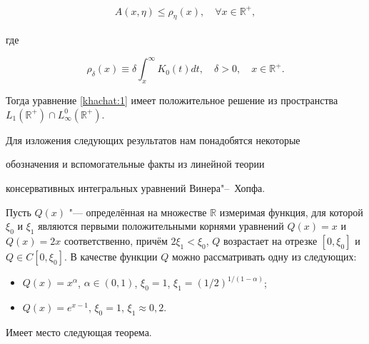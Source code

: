 \begin{theorem}[1]
\begin{itemize}
\begin{gather}
A(x,\eta)\leq\rho_{\eta}(x),\quad \forall x\in\mathbb{R}^+,

\label{khachat:7}

\end{gather}

где

\begin{equation}

\rho_{\delta}(x)\equiv\delta\int _{x}^{\infty}K_0(t)dt,\quad

\delta>0,\quad x\in\mathbb{R}^+.\label{khachat:8}

\end{equation}

\end{itemize}



Тогда уравнение \eqref{khachat:1} имеет положительное решение из пространства $L_1(\mathbb{R}^{+})\cap L_{\infty}^0(\mathbb{R}^+).$

\end{theorem}



\smallskip



Для изложения следующих результатов нам понадобятся некоторые

обозначения и вспомогательные факты из линейной теории

консервативных интегральных уравнений Винера"--~Хопфа.



Пусть $Q(x)$ "--- определённая на множестве $\mathbb{R}$ измеримая функция, для которой $\xi_0$ и $\xi_1$ являются первыми положительными корнями уравнений $Q(x)=x$ и $Q(x)=2x$ соответственно, причём $2\xi_1<\xi_0$, $Q$ возрастает на отрезке $[0,\xi_0]$ и $Q\in C[0,\xi_0]$. В качестве функции $Q$ можно рассматривать одну из следующих:

\begin{itemize}

\item[a)] $Q(x)=x^{\alpha}$, $\alpha\in(0,1)$,  $\xi_0=1$, $\xi_1=(1/2)^{1/(1-\alpha)}$;



\item[b)] $Q(x)=e^{x-1}$, $\xi_0=1$, $\xi_1\approx0,2$.

\end{itemize}





Имеет место следующая теорема.



